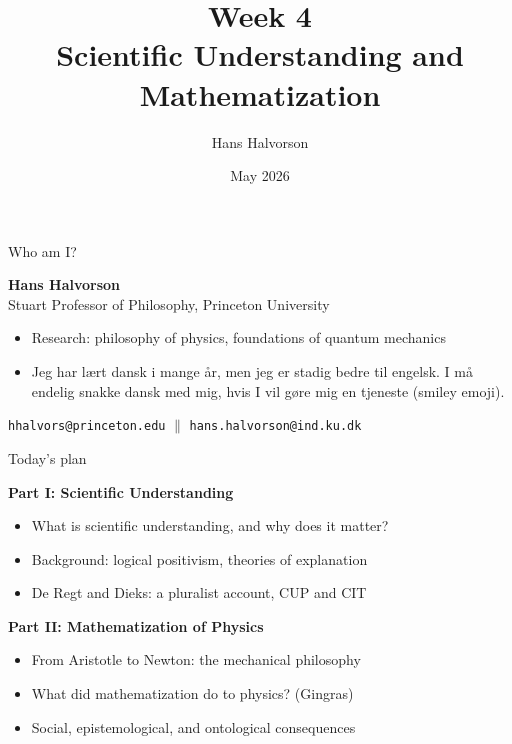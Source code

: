 \documentclass[fleqn]{beamer}
\title{Week 4 \\ Scientific Understanding and Mathematization}
\author{Hans Halvorson}
\date{May 2026}
\begin{document}
\begin{frame}
  \titlepage
\end{frame}

\begin{frame}{Who am I?}

  \textbf{Hans Halvorson} \\
  Stuart Professor of Philosophy, Princeton University

  \vspace{0.8em}
  \begin{itemize}
  \item Research: philosophy of physics, foundations of quantum
    mechanics
  \item Jeg har lært dansk i mange år, men jeg er stadig bedre til
    engelsk. I må endelig snakke dansk med mig, hvis I vil gøre mig en
    tjeneste (smiley emoji).
  \end{itemize}

  \vspace{0.8em}
  \texttt{hhalvors@princeton.edu} $\|$ \texttt{hans.halvorson@ind.ku.dk}

\end{frame}

\begin{frame}{Today's plan}

  \textbf{Part I: Scientific Understanding}
  \begin{itemize}\small
  \item What is scientific understanding, and why does it matter?
  \item Background: logical positivism, theories of explanation
  \item De Regt and Dieks: a pluralist account, CUP and CIT
  \end{itemize}

  \vspace{0.8em}
  \textbf{Part II: Mathematization of Physics}
  \begin{itemize}\small
  \item From Aristotle to Newton: the mechanical philosophy
  \item What did mathematization do to physics? (Gingras)
  \item Social, epistemological, and ontological consequences
  \end{itemize}

\end{frame}

\end{document}
